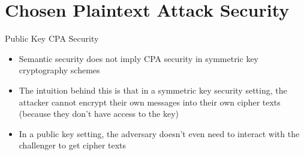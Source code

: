 \documentclass[handout]{beamer}
\begin{document}
\section{Chosen Plaintext Attack Security}

\begin{frame}{Public Key CPA Security}
  \begin{itemize}
    \item \pause Semantic security does not imply CPA security in symmetric key cryptography schemes
    \item \pause The intuition behind this is that in a symmetric key security setting, the attacker cannot encrypt their own messages into their own cipher texts (because they don't have access to the key)
    \item \pause In a public key setting, the adversary doesn't even need to interact with the challenger to get cipher texts
  \end{itemize}
\end{frame}
\end{document}
